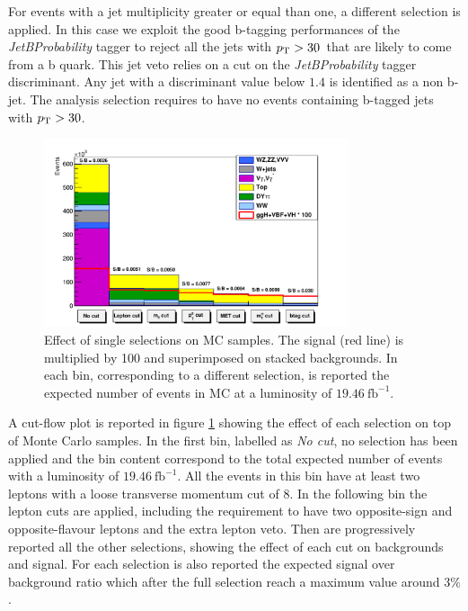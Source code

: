 For events with a jet multiplicity greater or equal than one, a different selection is applied. In this case we exploit the good b-tagging performances of the \textit{JetBProbability} tagger to reject all the jets with $p_\mathrm{T} > 30$~\GeV that are likely to come from a b quark. This jet veto relies on a cut on the \textit{JetBProbability} tagger discriminant. Any jet with a discriminant value below $1.4$ is identified as a non b-jet. The analysis selection requires to have no events containing b-tagged jets with $p_\mathrm{T} > 30$\GeV.

\begin{figure}[b]
\centering
\includegraphics[width=0.8\textwidth]{images/cutflow2.pdf}
\caption{Effect of single selections on MC samples. The signal (red line) is multiplied by 100 and superimposed on stacked backgrounds. In each bin, corresponding to a different selection, is reported the expected number of events in MC at a luminosity of $19.46~\mathrm{fb}^{-1}$.\label{fig:cutflow}}
\end{figure}

A  cut-flow plot is reported in figure \ref{fig:cutflow} showing the effect of each selection on top of Monte Carlo samples. In the first bin, labelled as \textit{No cut}, no selection has been applied and the bin content correspond to the total expected number of events with a luminosity of $19.46~\mathrm{fb}^{-1}$. All the events in this bin have at least two leptons with a loose transverse momentum cut of 8\GeV. In the following bin the lepton cuts are applied, including the requirement to have two opposite-sign and opposite-flavour leptons and the extra lepton veto. Then are progressively reported all the other selections, showing the effect of each cut on backgrounds and signal. For each selection is also reported the expected signal over background ratio which after the full selection reach a maximum value around $3\%$.

